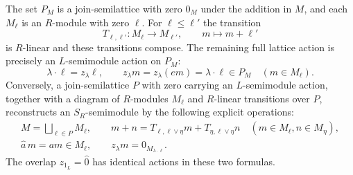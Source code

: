 \begin{theorem}\label{sh:modules}
The set $P_M$ is a join-semilattice with zero $0_M$ under the
addition in $M$, and each $M_\ell$ is an $R$-module with zero
$\ell$. For $\ell\le\ell'$ the transition
\begin{equation}\tag{SH11}\label{sh:transport}
 T_{\ell,\ell'}:M_\ell\to M_{\ell'},\qquad
 m\mapsto m+\ell'
\end{equation}
is $R$-linear and these transitions compose. The remaining full
lattice action is precisely an $L$-semimodule action on $P_M$:
\begin{equation}\tag{SH12}\label{sh:laction}
 \lambda\cdot\ell=z_\lambda\ell,\qquad
 z_\lambda m=z_\lambda(em)=\lambda\cdot\ell\in P_M
 \quad(m\in M_\ell).
\end{equation}
Conversely, a join-semilattice $P$ with zero carrying an
$L$-semimodule action, together with a diagram of $R$-modules
$M_\ell$ and $R$-linear transitions over $P$, reconstructs an
$S_R$-semimodule by the following explicit operations:
\begin{equation}\tag{SH13}\label{sh:reconstruction}
 \begin{gathered}
 M=\bigsqcup_{\ell\in P}M_\ell,\qquad
 m+n=T_{\ell,\ell\vee\eta}m+
             T_{\eta,\ell\vee\eta}n
       \quad(m\in M_\ell,n\in M_\eta),\\
 \widehat a\,m=am\in M_\ell,\qquad
 z_\lambda m=0_{M_{\lambda\cdot\ell}}.
 \end{gathered}
\end{equation}
The overlap $z_{1_L}=\widehat0$ has identical actions in these
two formulas.
\end{theorem}
